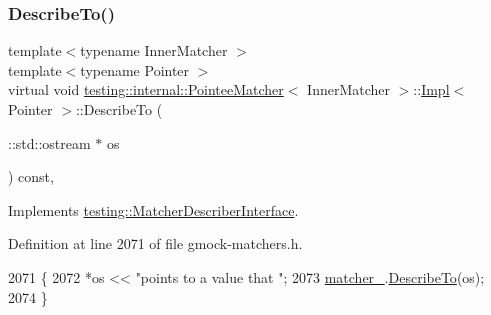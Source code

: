 \subsubsection{\texorpdfstring{Describe\+To()}{DescribeTo()}}
{\footnotesize\ttfamily template$<$typename Inner\+Matcher $>$ \\
template$<$typename Pointer $>$ \\
virtual void \hyperlink{classtesting_1_1internal_1_1PointeeMatcher}{testing\+::internal\+::\+Pointee\+Matcher}$<$ Inner\+Matcher $>$\+::\hyperlink{classtesting_1_1internal_1_1PointeeMatcher_1_1Impl}{Impl}$<$ Pointer $>$\+::Describe\+To (\begin{DoxyParamCaption}\item[{\+::std\+::ostream $\ast$}]{os }\end{DoxyParamCaption}) const\hspace{0.3cm}{\ttfamily [inline]}, {\ttfamily [virtual]}}



Implements \hyperlink{classtesting_1_1MatcherDescriberInterface_ad9f861588bd969b6e3e717f13bb94e7b}{testing\+::\+Matcher\+Describer\+Interface}.



Definition at line 2071 of file gmock-\/matchers.\+h.


\begin{DoxyCode}
2071                                                   \{
2072       *os << \textcolor{stringliteral}{"points to a value that "};
2073       \hyperlink{classtesting_1_1internal_1_1PointeeMatcher_1_1Impl_a8b6095eca981f76156d7e301cef455a0}{matcher\_}.\hyperlink{classtesting_1_1internal_1_1MatcherBase_a7e0c883c7745e0d646463077ef1c1267}{DescribeTo}(os);
2074     \}
\end{DoxyCode}
\mbox{\label{classtesting_1_1internal_1_1PointeeMatcher_1_1Impl_a5f3c5482155707dc44eee5e4eb7d5081}} 
